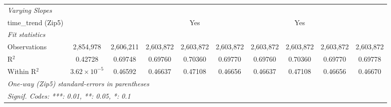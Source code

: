 \begin{table}[H]
{\begin{tabular}{lccccccccc}
 \midrule \emph{Varying Slopes}&   &   &   &   &   &   &   &   &  \\ 

 time\_trend (Zip5) &  &  &  & Yes &  &  & Yes &  & \\ 

 \midrule \emph{Fit statistics}&  & & & & & & & & \\ 

 Observations & 2,854,978&2,606,211&2,603,872&2,603,872&2,603,872&2,603,872&2,603,872&2,603,872&2,603,872\\ 

 R$^2$ & 0.42728&0.69748&0.69760&0.70360&0.69770&0.69760&0.70360&0.69770&0.69778\\ 

 Within R$^2$ & $3.62\times 10^{-5}$&0.46592&0.46637&0.47108&0.46656&0.46637&0.47108&0.46656&0.46670\\ 

 \midrule\midrule\multicolumn{10}{l}{\emph{One-way (Zip5) standard-errors in parentheses}}\\ 

 \multicolumn{10}{l}{\emph{Signif. Codes: ***: 0.01, **: 0.05, *: 0.1}}\\ 

 \end{tabular}} 

 \end{table} 

  

